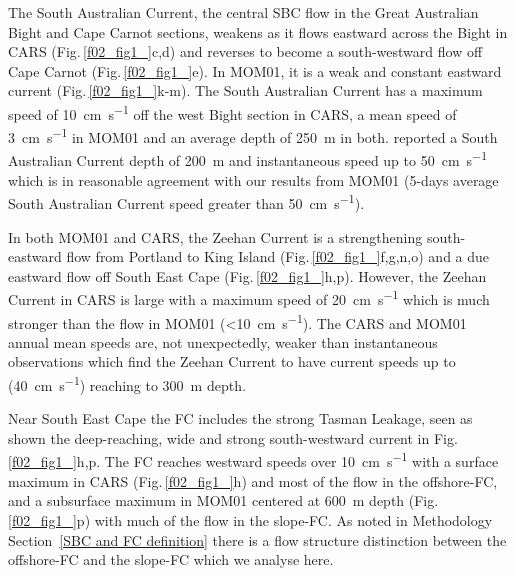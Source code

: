 \documentclass[preprint,3p,review,12pt]{elsarticle}
\begin{document}
The South Australian Current, the central SBC flow in the Great Australian Bight and Cape Carnot sections, weakens as it flows eastward across the Bight in CARS (Fig.\,\ref{f02_fig1_}c,d) and reverses to become a south-westward flow off Cape Carnot (Fig.\,\ref{f02_fig1_}e). In MOM01, it is a weak and constant eastward current (Fig.\,\ref{f02_fig1_}k-m). The South Australian Current has a maximum speed of \SI{10}{\centi\meter\per\second} off the west Bight section in CARS, a mean speed of \SI{3}{\centi\meter\per\second} in MOM01 and an average depth of \SI{250}{\meter} in both. \citet{Middleton2007} reported a South Australian Current depth of \SI{200}{\meter} and instantaneous speed up to \SI{50}{\centi\meter\per\second} which is in reasonable agreement with our results from MOM01 (5-days average South Australian Current speed greater than \SI{50}{\centi\meter\per\second}).

In both MOM01 and CARS, the Zeehan Current is a strengthening south-eastward flow from Portland to King Island (Fig.\,\ref{f02_fig1_}f,g,n,o) and a due eastward flow off South East Cape (Fig.\,\ref{f02_fig1_}h,p). However, the Zeehan Current in CARS is large with a maximum speed of \SI{20}{\centi\meter\per\second} which is much stronger than the flow in MOM01 (\SI{<10}{\centi\meter\per\second}). The CARS and MOM01 annual mean speeds are, not unexpectedly, weaker than instantaneous observations \citep{Ridgway2007} which find the Zeehan Current to have current speeds up to (\SI{40}{\centi\meter\per\second}) reaching to \SI{300}{\meter} depth.

Near South East Cape the FC includes the strong Tasman Leakage, seen as shown the deep-reaching, wide and strong south-westward current in Fig.\,\ref{f02_fig1_}h,p.
The FC reaches westward speeds over \SI{10}{\centi\meter\per\second} with a surface maximum in CARS (Fig.\,\ref{f02_fig1_}h) and most of the flow in the offshore-FC, and a subsurface maximum in MOM01 centered at \SI{600}{\meter} depth (Fig.\,\ref{f02_fig1_}p) with much of the flow in the slope-FC\@. As noted in Methodology Section~\ref{SBC and FC definition} there is a flow structure distinction between the offshore-FC and the slope-FC which we analyse here.
\end{document}
